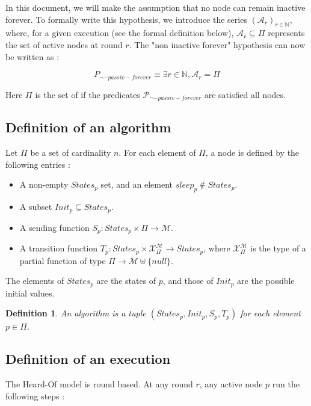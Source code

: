 \documentclass{article}
\newtheorem{definition}{Definition}
\begin{document}
In this document, we will make the assumption that no node can remain inactive forever.
To formally write this hypothesis, we introduce the series $(\mathcal{A}_r)_{r \in \mathds{N}}$, where, for a given execution (see the formal definition below), $\mathcal{A}_r \subseteq \Pi$ 
represents the set of active nodes at round $r$.
The "non inactive forever" hypothesis can now be written as :

$$P_{\neg-passiv-forever} \equiv \exists r \in \mathds{N}, \mathcal{A}_r = \Pi$$

Here $\Pi$ is the set of if the predicates $\mathcal{P}_{\neg-passiv-forever}$ are satisfied all nodes.

\subsection{Definition of an algorithm}

Let $\Pi$ be a set of cardinality $n$. For each element of $\Pi$, a node is defined by the following entries :

\begin{itemize}
	\item A non-empty $States_p$ set, and an element $sleep_p \notin States_p$.
	\item A subset $Init_p \subseteq States_p$.
	\item A sending function $S_p : States_p \times \Pi \rightarrow \mathcal{M}$.
	\item A transition function $T_p : States_p \times \mathcal{X}_\Pi^{\mathcal{M}} \rightarrow States_p$,
		where $\mathcal{X}_\Pi^{\mathcal{M}}$ is the type of a partial function
		of type $\Pi \rightarrow \mathcal{M} \uplus \{null\}$.
\end{itemize}

The elements of $States_p$ are the states of $p$, and those of $Init_p$ are the possible initial values.

\begin{definition}
	An algorithm is a tuple $(States_p, Init_p, S_p, T_p)$ for each element $p \in \Pi$.
\end{definition}


\subsection{Definition of an execution}

The Heard-Of model is round based. At any round $r$, any active node $p$ run the following steps :
\end{document}
